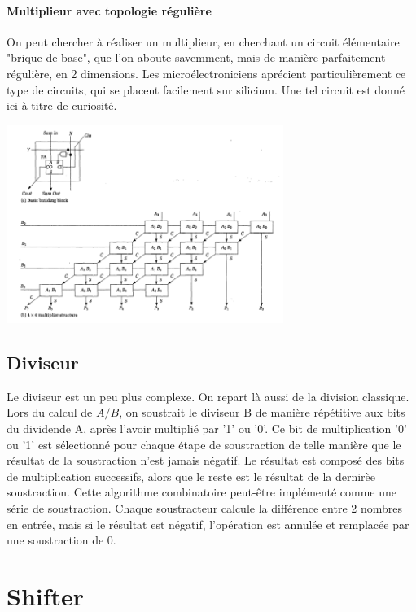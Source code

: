 \paragraph{Multiplieur avec topologie régulière}
On peut chercher à réaliser un multiplieur, en cherchant un circuit élémentaire "brique de base", que l'on aboute savemment, mais de manière parfaitement régulière, en 2 dimensions. Les microélectroniciens aprécient particulièrement
ce type de circuits, qui se placent facilement sur silicium. Une tel circuit est donné ici à titre de curiosité.

\begin{center}
  \centering
  \includegraphics[width=9cm]{./figures/mult-4.png}
\end{center}

\subsection{Diviseur}
Le diviseur est un peu plus complexe. On repart là aussi de la division classique. Lors du calcul de $A/B$,
on soustrait le diviseur B de manière répétitive aux bits du dividende A, après l'avoir multiplié par '1' ou '0'.
Ce bit de multiplication '0' ou '1' est sélectionné pour chaque étape de soustraction de telle manière que le résultat
de la soustraction n'est jamais négatif. Le résultat est composé des bits de multiplication successifs, alors que
le reste est le résultat de la dernirèe soustraction. Cette algorithme combinatoire peut-être implémenté
comme une série de soustraction. Chaque soustracteur calcule la différence entre 2 nombres en entrée, mais
si le résultat est négatif, l'opération est annulée et remplacée par une soustraction de 0.

\section{Shifter}

